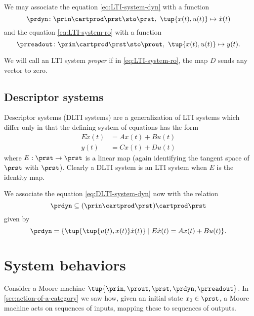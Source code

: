 We may associate the equation \cref{eq:LTI-system-dyn} with a function 
\begin{equation}
\prdyn \colon  \prin \cartprod \prst \sto \prst, \ \tup{x(t), u(t)} \mapsto \dot x(t)
\end{equation}
and the equation \cref{eq:LTI-system-ro} with a function 
\begin{equation}
\prreadout \colon \prin \cartprod \prst \sto \prout, \ \tup{x(t), u(t)} \mapsto y(t).
\end{equation}

We will call an LTI system \emph{proper} if in \cref{eq:LTI-system-ro}, the map $D$ sends any vector to zero. 


\subsection{Descriptor systems}

Descriptor systems (DLTI systems) are a generalization of LTI systems which differ only in that the defining system of equations has the form
\begin{align}
        E \dot x(t) &= Ax(t) + Bu(t) \label{eq:DLTI-system-dyn} \\
        y(t) &= Cx(t) + Du(t) \label{eq:DLTI-system-ro}
\end{align}
where $E: \prst \to \prst$ is a linear map (again identifying the tangent space of $\prst$ with $\prst$). Clearly a DLTI system is an LTI system when $E$ is the identity map. 

We associate the equation \cref{eq:DLTI-system-dyn} now with the relation 
\begin{equation}
\prdyn \subseteq  (\prin \cartprod \prst) \cartprod \prst
\end{equation}
given by 
\begin{equation}
\prdyn = \{ \tup{ \tup{u(t), x(t)} \dot x(t)} \mid E \dot x(t) = Ax(t) + Bu(t) \}.
\end{equation}



\section{System behaviors}


Consider a Moore machine $\tup{\prin, \prout, \prst, \prdyn, \prreadout}$. 
In \cref{sec:action-of-a-category} we saw how, given an initial state $x_0 \in \prst$, a Moore machine acts on sequences of inputs, mapping these to sequences of outputs. 

